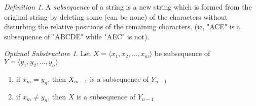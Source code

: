 \documentclass[UTF8]{ctexart}
\theoremstyle{remark}
\begin{document}
\newtheorem*{mydef}{Definition}
\begin{mydef}
A \emph{subsequence} of a string is a new string which is formed from the original string 
by deleting some (can be none) of the characters without disturbing the relative positions 
of the remaining characters. (ie, "ACE" is a subsequence of "ABCDE" while "AEC" is not).
\end{mydef}

\newcommand*{\lnwarrow}{
  \leftarrow\llap{$\nwarrow$}
}
\newtheorem*{opt}{Optimal Substructure}
\begin{opt}
Let $X = \langle x_1, x_2, \dots, x_m \rangle$ be subsequence of $Y = \langle y_1, y_2, \dots, y_n \rangle$
	\begin{enumerate}
		\item if $x_m = y_n$, then $X_{m-1}$ is a subsequence of $Y_{n-1}$
		\item if $x_m \neq y_n$, then $X$ is a subsequence of $Y_{n-1}$ 
	\end{enumerate}
\end{opt}
\end{document}
